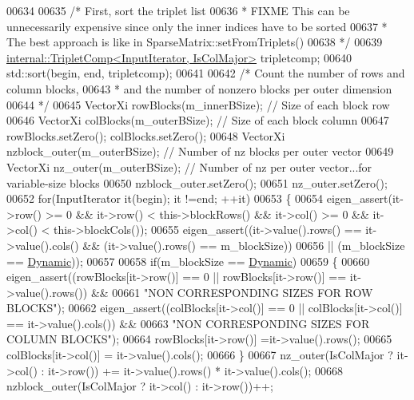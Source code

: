 \begin{DoxyCode}
00634 
00635       \textcolor{comment}{/* First, sort the triplet list}
00636 \textcolor{comment}{        * FIXME This can be unnecessarily expensive since only the inner indices have to be sorted}
00637 \textcolor{comment}{        * The best approach is like in SparseMatrix::setFromTriplets()}
00638 \textcolor{comment}{        */}
00639       \hyperlink{struct_eigen_1_1internal_1_1_triplet_comp}{internal::TripletComp<InputIterator, IsColMajor>} 
      tripletcomp;
00640       std::sort(begin, end, tripletcomp);
00641 
00642       \textcolor{comment}{/* Count the number of rows and column blocks,}
00643 \textcolor{comment}{       * and the number of nonzero blocks per outer dimension}
00644 \textcolor{comment}{       */}
00645       VectorXi rowBlocks(m\_innerBSize); \textcolor{comment}{// Size of each block row}
00646       VectorXi colBlocks(m\_outerBSize); \textcolor{comment}{// Size of each block column}
00647       rowBlocks.setZero(); colBlocks.setZero();
00648       VectorXi nzblock\_outer(m\_outerBSize); \textcolor{comment}{// Number of nz blocks per outer vector}
00649       VectorXi nz\_outer(m\_outerBSize); \textcolor{comment}{// Number of nz per outer vector...for variable-size blocks}
00650       nzblock\_outer.setZero();
00651       nz\_outer.setZero();
00652       \textcolor{keywordflow}{for}(InputIterator it(begin); it !=end; ++it)
00653       \{
00654         eigen\_assert(it->row() >= 0 && it->row() < this->blockRows() && it->col() >= 0 && it->col() < 
      this->blockCols());
00655         eigen\_assert((it->value().rows() == it->value().cols() && (it->value().rows() == m\_blockSize))
00656                      || (m\_blockSize == \hyperlink{namespace_eigen_ad81fa7195215a0ce30017dfac309f0b2}{Dynamic}));
00657 
00658         \textcolor{keywordflow}{if}(m\_blockSize == \hyperlink{namespace_eigen_ad81fa7195215a0ce30017dfac309f0b2}{Dynamic})
00659         \{
00660           eigen\_assert((rowBlocks[it->row()] == 0 || rowBlocks[it->row()] == it->value().rows()) &&
00661               \textcolor{stringliteral}{"NON CORRESPONDING SIZES FOR ROW BLOCKS"});
00662           eigen\_assert((colBlocks[it->col()] == 0 || colBlocks[it->col()] == it->value().cols()) &&
00663               \textcolor{stringliteral}{"NON CORRESPONDING SIZES FOR COLUMN BLOCKS"});
00664           rowBlocks[it->row()] =it->value().rows();
00665           colBlocks[it->col()] = it->value().cols();
00666         \}
00667         nz\_outer(IsColMajor ? it->col() : it->row()) += it->value().rows() * it->value().cols();
00668         nzblock\_outer(IsColMajor ? it->col() : it->row())++;

\end{DoxyCode}
